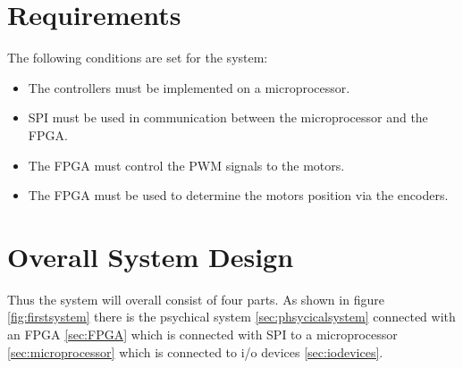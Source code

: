 \section{Requirements}

The following conditions are set for the system:
\begin{itemize}
\item The controllers must be implemented on a microprocessor.
\item SPI must be used in communication between the microprocessor and the FPGA.
\item The FPGA must control the PWM signals to the motors.
\item The FPGA must be used to determine the motors position via the encoders.
\end{itemize}

\section{Overall System Design}

Thus the system will overall consist of four parts. As shown in figure \ref{fig:firstsystem} there is the psychical system \ref{sec:phsycicalsystem} connected with an FPGA \ref{sec:FPGA} which is connected with SPI to a microprocessor \ref{sec:microprocessor} which is connected to i/o devices \ref{sec:iodevices}.

